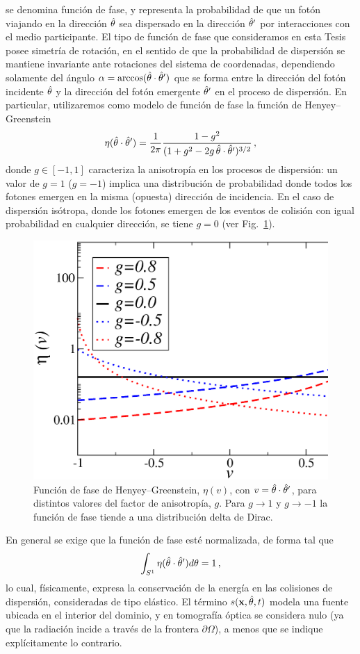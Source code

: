 se denomina función de fase, y representa la probabilidad de que un fotón 
viajando en la dirección $\hat{\theta}$ sea dispersado en la dirección $\hat{\theta}'$ 
por interacciones con el medio participante. El tipo de función 
de fase que consideramos en esta Tesis posee simetría de rotación, 
en el sentido de que la probabilidad de dispersión se mantiene invariante 
ante rotaciones del sistema de coordenadas, dependiendo solamente 
del ángulo $\alpha=\arccos(\hat{\theta} \cdot \hat{\theta}')$ que se forma entre la dirección 
del fotón incidente $\hat{\theta}$ y la dirección del fotón emergente $\hat{\theta}'$ 
en el proceso de dispersión. En particular, utilizaremos como modelo de función de fase la 
función de Henyey--Greenstein~\cite{Henyey1941}
\begin{equation}
\eta(\hat{\theta}\cdot\hat{\theta}')=\frac{1}{2\pi} 
\frac{1-g^2}{(1+g^2-2g \, \hat{\theta} \cdot \hat{\theta}')^{3/2}} \,,
\label{eq:Henyey-Greeinstein}
\end{equation}
donde $g \in [-1,1]$ caracteriza la anisotropía en los procesos de dispersión: 
 un valor de $g=1$ ($g=-1$) implica una distribución de probabilidad donde todos
los fotones emergen en la misma (opuesta) dirección de 
incidencia. En el caso de dispersión isótropa, 
donde los fotones emergen de los eventos de colisión con igual probabilidad 
en cualquier dirección, se tiene $ g = 0 $ (ver Fig.~\ref{fig:Henyey--Greenstein}). 
\begin{figure}[h!]
\centering
  \includegraphics[width=0.5\linewidth]{figuras/henyey.eps}
  \caption{Función de fase de Henyey--Greenstein, $\eta(v)$, 
  con $v=\hat{\theta} \cdot \hat{\theta}'$, para distintos valores del factor de anisotropía, $g$. Para $g\to 1$ 
  y $g\to -1$ la función de fase tiende a una distribución delta de Dirac.}
 \label{fig:Henyey--Greenstein}
\end{figure}

En general se exige que la función de fase 
esté normalizada, de forma tal que
\begin{equation}
\int_{S^1}\eta(\hat{\theta}\cdot\hat{\theta}') d\theta=1 \,,
\label{eq:Henyey-Greeinsteinnorm}
\end{equation}
lo cual, físicamente, expresa la conservación de la energía en las colisiones 
de dispersión, consideradas de tipo elástico. El término $ s(\mathbf{x},\hat{\theta},t)$ 
modela una fuente ubicada en el interior del dominio, y en tomografía óptica 
se considera nulo (ya que la radiación incide a través de la frontera $\partial \Omega$), 
a menos que se indique explícitamente lo contrario. 

